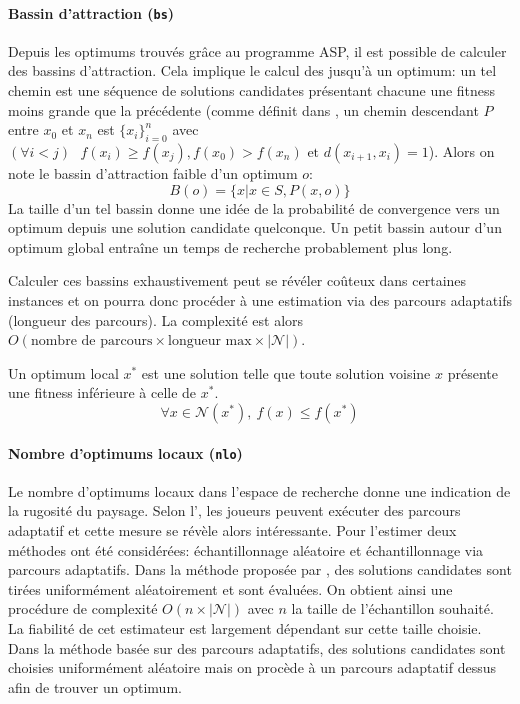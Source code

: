 \documentclass[../main.tex]{subfiles}
\begin{document}
	\paragraph{Bassin d'attraction (\texttt{bs})}{Depuis les optimums trouvés grâce au programme ASP, il est possible de calculer des bassins d'attraction. Cela implique le calcul des  jusqu'à un optimum: un tel chemin est une séquence de solutions candidates présentant chacune une fitness moins grande que la précédente (comme définit dans \cite{pitzer}, un chemin descendant $P$ entre $x_0$ et $x_n$ est $\{x_i\}_{i=0}^n$ avec $(\forall i < j)\text{ }f(x_i) \geq f(x_j), f(x_0) > f(x_n) \text{ et } d(x_{i+1}, x_i) = 1$). Alors on note le bassin d'attraction faible d'un optimum $o$:
	\begin{equation*}
	    B(o) = \{x | x \in S, P(x, o)\}
	\end{equation*}
La taille d'un tel bassin donne une idée de la probabilité de convergence vers un optimum depuis une solution candidate quelconque. Un petit bassin autour d'un optimum global entraîne un temps de recherche probablement plus long.

Calculer ces bassins exhaustivement peut se révéler coûteux dans certaines instances et on pourra donc procéder à une estimation via des parcours adaptatifs \cite{garnier} (longueur des parcours). La complexité est alors $O(\text{nombre de parcours} \times \text{longueur max} \times |\mathcal{N}|)$.
	}
	
\begin{definition}
    Un optimum local $x^*$ est une solution telle que toute solution voisine $x$ présente une fitness inférieure à celle de $x^*$.
    \begin{equation*}
        \forall x \in \mathcal{N}(x^*),~f(x) \leq f(x^*)
    \end{equation*}
\end{definition}

    \paragraph{Nombre d'optimums locaux (\texttt{nlo})}{
Le nombre d'optimums locaux dans l'espace de recherche donne une indication de la rugosité du paysage. Selon l', les joueurs peuvent exécuter des parcours adaptatif et cette mesure se révèle alors intéressante. Pour l'estimer deux méthodes ont été considérées: échantillonnage aléatoire et échantillonnage via parcours adaptatifs. Dans la méthode proposée par \cite{alyahya}, des solutions candidates sont tirées uniformément aléatoirement et sont évaluées. On obtient ainsi une procédure de complexité $O(n \times |\mathcal{N}|)$ avec $n$ la taille de l'échantillon souhaité. La fiabilité de cet estimateur est largement dépendant sur cette taille choisie. Dans la méthode basée sur des parcours adaptatifs, des solutions candidates sont choisies uniformément aléatoire mais on procède à un parcours adaptatif dessus afin de trouver un optimum. 
    }
	
\end{document}
